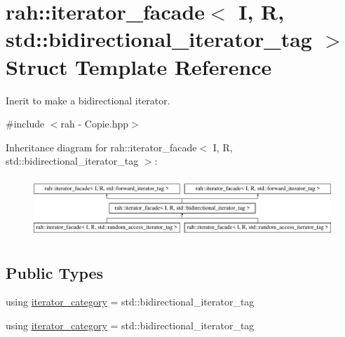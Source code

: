 \hypertarget{structrah_1_1iterator__facade_3_01_i_00_01_r_00_01std_1_1bidirectional__iterator__tag_01_4}{}\section{rah\+::iterator\+\_\+facade$<$ I, R, std\+::bidirectional\+\_\+iterator\+\_\+tag $>$ Struct Template Reference}
\label{structrah_1_1iterator__facade_3_01_i_00_01_r_00_01std_1_1bidirectional__iterator__tag_01_4}


Inerit to make a bidirectional iterator.  




{\ttfamily \#include $<$rah -\/ Copie.\+hpp$>$}

Inheritance diagram for rah\+::iterator\+\_\+facade$<$ I, R, std\+::bidirectional\+\_\+iterator\+\_\+tag $>$\+:\begin{figure}[H]
\begin{center}
\leavevmode
\includegraphics[height=2.295082cm]{structrah_1_1iterator__facade_3_01_i_00_01_r_00_01std_1_1bidirectional__iterator__tag_01_4}
\end{center}
\end{figure}
\subsection*{Public Types}
\begin{DoxyCompactItemize}
\item 
using \mbox{\hyperlink{structrah_1_1iterator__facade_3_01_i_00_01_r_00_01std_1_1bidirectional__iterator__tag_01_4_a044a4ae4f097558e10b1d52b892a093a}{iterator\+\_\+category}} = std\+::bidirectional\+\_\+iterator\+\_\+tag
\item 
using \mbox{\hyperlink{structrah_1_1iterator__facade_3_01_i_00_01_r_00_01std_1_1bidirectional__iterator__tag_01_4_a044a4ae4f097558e10b1d52b892a093a}{iterator\+\_\+category}} = std\+::bidirectional\+\_\+iterator\+\_\+tag
\end{DoxyCompactItemize}
